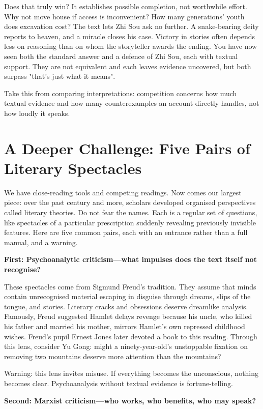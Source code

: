 Does that truly win? It establishes possible completion, not worthwhile effort. Why not move house if access is inconvenient? How many generations' youth does excavation cost? The text lets Zhi Sou ask no further. A snake-bearing deity reports to heaven, and a miracle closes his case. Victory in stories often depends less on reasoning than on whom the storyteller awards the ending. You have now seen both the standard answer and a defence of Zhi Sou, each with textual support. They are not equivalent and each leaves evidence uncovered, but both surpass "that's just what it means".

Take this from comparing interpretations: competition concerns how much textual evidence and how many counterexamples an account directly handles, not how loudly it speaks.

\section[Further Challenge: Five Literary Lenses]{A Deeper Challenge: Five Pairs of Literary Spectacles}
We have close-reading tools and competing readings. Now comes our largest piece: over the past century and more, scholars developed organised perspectives called literary theories. Do not fear the names. Each is a regular set of questions, like spectacles of a particular prescription suddenly revealing previously invisible features. Here are five common pairs, each with an entrance rather than a full manual, and a warning.

\textbf{First: Psychoanalytic criticism---what impulses does the text itself not recognise?}

These spectacles come from Sigmund Freud's tradition. They assume that minds contain unrecognised material escaping in disguise through dreams, slips of the tongue, and stories. Literary cracks and obsessions deserve dreamlike analysis. Famously, Freud suggested Hamlet delays revenge because his uncle, who killed his father and married his mother, mirrors Hamlet's own repressed childhood wishes. Freud's pupil Ernest Jones later devoted a book to this reading. Through this lens, consider Yu Gong: might a ninety-year-old's unstoppable fixation on removing two mountains deserve more attention than the mountains?

Warning: this lens invites misuse. If everything becomes the unconscious, nothing becomes clear. Psychoanalysis without textual evidence is fortune-telling.

\textbf{Second: Marxist criticism---who works, who benefits, who may speak?}

